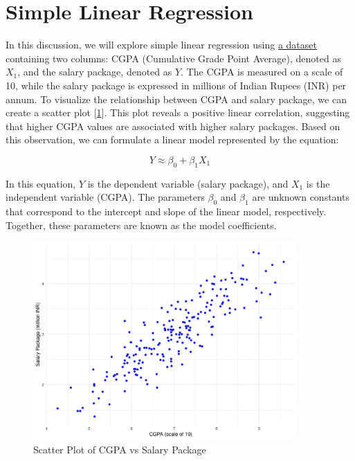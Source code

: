 \section{Simple Linear Regression}

In this discussion, we will explore simple linear regression using \href{https://raw.githubusercontent.com/MSc-Books/Generalised-Regression-Models/refs/heads/main/chapters/chapter1/data/placement.csv}{a dataset} containing two columns: CGPA (Cumulative Grade Point Average), denoted as \(X_1\), and the salary package, denoted as \(Y\). The CGPA is measured on a scale of 10, while the salary package is expressed in millions of Indian Rupees (INR) per annum. To visualize the relationship between CGPA and salary package, we can create a scatter plot [\ref{fig:scatter_plot_cgpa_salary}]. This plot reveals a positive linear correlation, suggesting that higher CGPA values are associated with higher salary packages. Based on this observation, we can formulate a linear model represented by the equation:

\[
Y \approx \beta_0 + \beta_1 X_1
\]

In this equation, \(Y\) is the dependent variable (salary package), and \(X_1\) is the independent variable (CGPA). The parameters \(\beta_0\) and \(\beta_1\) are unknown constants that correspond to the intercept and slope of the linear model, respectively. Together, these parameters are known as the model coefficients.\\

\begin{figure}[h!]
    \centering
    \includegraphics[width=0.9\textwidth]{chapters/chapter1/plots/scatter_plot.png}
    \caption{Scatter Plot of CGPA vs Salary Package}
    \label{fig:scatter_plot_cgpa_salary}
\end{figure}

